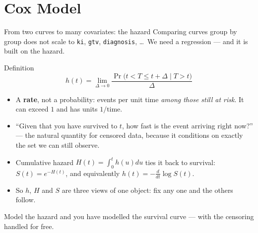 \documentclass[aspectratio=169,11pt]{beamer}
\begin{document}
\section{Cox Model}

\begin{frame}{From two curves to many covariates: the hazard}
  \scriptsize
  Comparing curves group by group does not scale to \texttt{ki}, \texttt{gtv},
  \texttt{diagnosis}, \dots\ We need a regression --- and it is built on the hazard.
  \begin{block}{Definition}
    \[
      \boxed{\;h(t)=\lim_{\Delta\to 0}
        \frac{\Pr\bigl(t< T\le t+\Delta \mid T>t\bigr)}{\Delta}\;}
    \]
  \end{block}
  \begin{readme}
    \begin{itemize}
      \item A \textbf{rate}, not a probability: events per unit time \emph{among those
            still at risk}. It can exceed $1$ and has units $1/\text{time}$.
      \item ``Given that you have survived to $t$, how fast is the event arriving right
            now?'' --- the natural quantity for censored data, because it conditions on
            exactly the set we can still observe.
      \item Cumulative hazard $H(t)=\int_0^t h(u)du$ ties it back to survival:
            $S(t)=e^{-H(t)}$, and equivalently $h(t)=-\frac{d}{dt}\log S(t)$.
      \item So $h$, $H$ and $S$ are three views of one object: fix any one and the others
            follow.
    \end{itemize}
  \end{readme}
  \begin{takeaway}
    Model the hazard and you have modelled the survival curve --- with the censoring
    handled for free.
  \end{takeaway}
\end{frame}
\end{document}
